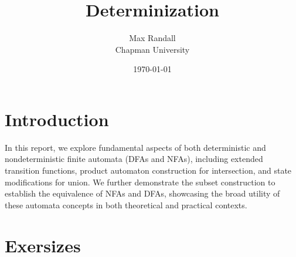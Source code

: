 \documentclass{article}
\title{Determinization}
\author{Max Randall \\ Chapman University}
\date{\today}
\theoremstyle{theorem}
\theoremstyle{definition}
\theoremstyle{remark}
\begin{document}
\maketitle

\setcounter{tocdepth}{3}
\tableofcontents

\section{Introduction}\label{sec:intro}
In this report, we explore fundamental aspects of both deterministic and nondeterministic finite automata (DFAs and NFAs), including extended transition functions, product automaton construction for intersection, and state modifications for union. We further demonstrate the subset construction to establish the equivalence of NFAs and DFAs, showcasing the broad utility of these automata concepts in both theoretical and practical contexts.
\newpage
\section{Exersizes}\label{sec:week-by-week}

\noindent
\end{document}
